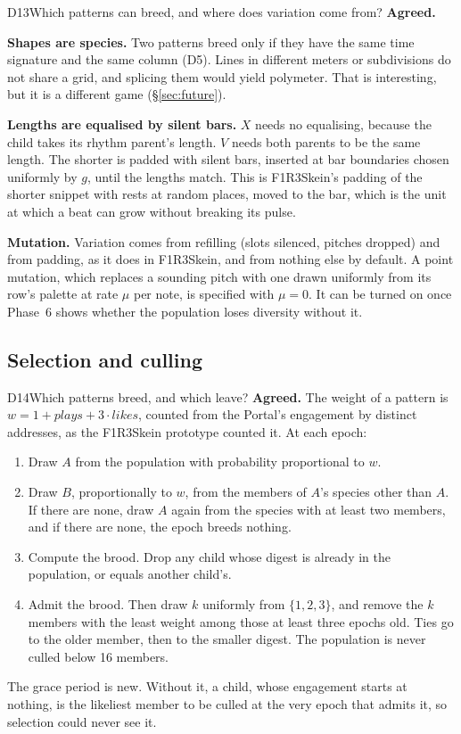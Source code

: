 \documentclass[11pt,a4paper]{article}
\begin{document}
\begin{decision}{D13}{Which patterns can breed, and where does variation come from?}
\textbf{Agreed.}

\textbf{Shapes are species.} Two patterns breed only if they have the same time signature and
the same column (D5). Lines in different meters or subdivisions do not share a grid, and splicing them would yield polymeter. That
is interesting, but it is a different game (\S\ref{sec:future}).

\textbf{Lengths are equalised by silent bars.} $X$ needs no equalising, because the child takes
its rhythm parent's length. $V$ needs both parents to be the same length. The shorter is padded
with silent bars, inserted at bar boundaries chosen uniformly by $g$, until the lengths match.
This is F1R3Skein's padding of the shorter snippet with rests at random places, moved to the
bar, which is the unit at which a beat can grow without breaking its pulse.

\textbf{Mutation.} Variation comes from refilling (slots silenced, pitches dropped) and from
padding, as it does in F1R3Skein, and from nothing else by default. A point mutation, which
replaces a sounding pitch with one drawn uniformly from its row's palette at rate $\mu$ per
note, is specified with $\mu=0$. It can be turned on once Phase~6 shows whether the population
loses diversity without it.
\end{decision}

\subsection{Selection and culling}

\begin{decision}{D14}{Which patterns breed, and which leave?}
\textbf{Agreed.} The weight of a pattern is
$w=1+\mathit{plays}+3\cdot\mathit{likes}$, counted from the Portal's engagement by distinct
addresses, as the F1R3Skein prototype counted it. At each epoch:
\begin{enumerate}[leftmargin=1.4em,itemsep=1pt]
\item Draw $A$ from the population with probability proportional to $w$.
\item Draw $B$, proportionally to $w$, from the members of $A$'s species other than $A$. If
  there are none, draw $A$ again from the species with at least two members, and if there are none,
  the epoch breeds nothing.
\item Compute the brood. Drop any child whose digest is already in the population, or equals
  another child's.
\item Admit the brood. Then draw $k$ uniformly from $\{1,2,3\}$, and remove the $k$ members
  with the least weight among those at least three epochs old. Ties go to the older member,
  then to the smaller digest. The population is never culled below 16 members.
\end{enumerate}
The grace period is new. Without it, a child, whose engagement starts at nothing, is the
likeliest member to be culled at the very epoch that admits it, so selection could never see
it.
\end{decision}
\end{document}
